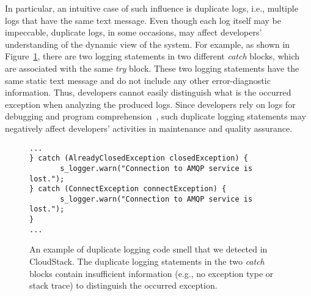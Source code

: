 In particular, an intuitive case of such influence is duplicate logs, i.e., multiple logs that have the same text message. Even though each log itself may be impeccable, duplicate logs, in some occasions, may affect developers' understanding of the dynamic view of the system. For example, as shown in Figure~\ref{fig:M_example_intro}, there are two logging statements in two different {\em catch} blocks, which are associated with the same {\em try} block. These two logging statements have the same static text message and do not include any other error-diagnostic information. Thus, developers cannot easily distinguish what is the occurred exception when analyzing the produced logs.
Since developers rely on logs for debugging and program comprehension~\cite{Shang:2014:ULL:2705615.2706065}, such duplicate logging statements may negatively affect developers' activities in maintenance and quality assurance. %

 \begin{figure}
 \centering

\begin{lstlisting}
...
} catch (AlreadyClosedException closedException) {
       s_logger.warn("Connection to AMQP service is lost.");
} catch (ConnectException connectException) {
       s_logger.warn("Connection to AMQP service is lost.");
}
...
\end{lstlisting}
\vspace{-0.3cm}
 \caption{An example of duplicate logging code smell that we detected in CloudStack. The duplicate logging statements in the two {\em catch} blocks contain insufficient information (e.g., no exception type or stack trace) to distinguish the occurred exception.}
 \vspace{-0.3cm}
 \label{fig:M_example_intro}
 \end{figure}



